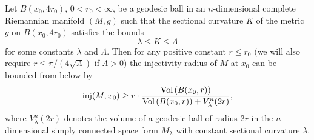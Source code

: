 \begin{theorem}
  \label{thm:cz-local-injectivity-radius-estimate-from-volume-and-curvature}
Let $B(x_0, 4r_0)$, $0<r_0<\infty$, be a geodesic ball in an
$n$-dimensional complete Riemannian manifold $(M,g)$ such that the
sectional curvature $K$ of the metric $g$ on $B(x_0,4r_0)$
satisfies the bounds
$$
\lambda\leq K\leq\Lambda
$$
for some constants $\lambda$ and $\Lambda$. Then for any positive
constant $r\le r_0$ $($we will also require $r\le
\pi/(4\sqrt{\Lambda})$ if $\Lambda>0)$ the injectivity radius of
$M$ at $x_0$ can be bounded from below by
$$
\mbox{\rm inj}(M, x_0)\geq r\cdot\frac{{\rm Vol}\,(B(x_0,
r))}{{\rm Vol}\,(B(x_0,r))+V^n_{\lambda}(2r)},
$$
where $V_{\lambda}^n(2r)$ denotes the volume of a geodesic ball of
radius $2r$ in the $n$-dimensional simply connected space form
$M_{\lambda}$ with constant sectional curvature $\lambda$.
\end{theorem}

